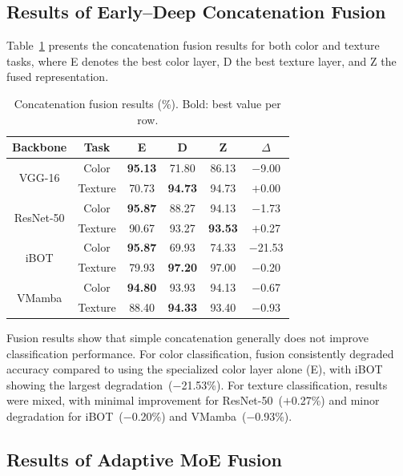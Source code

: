 \documentclass[conference]{IEEEtran}
\begin{document}
\subsection{Results of Early--Deep Concatenation Fusion}

Table~\ref{tab_concat} presents the concatenation fusion results for both
color and texture tasks, where E denotes the best color layer, D the best
texture layer, and Z the fused representation.

\begin{table}[htbp]
\caption{Concatenation fusion results (\%). Bold: best value per row.}
\begin{center}
\begin{tabular}{c|c|c|c|c|c}
\hline
\textbf{Backbone} & \textbf{Task} & \textbf{E} & \textbf{D}
                  & \textbf{Z} & \textbf{$\Delta$} \\
\hline
\multirow{2}{*}{VGG-16}
  & Color   & \textbf{95.13} & 71.80 & 86.13 & $-$9.00 \\
  & Texture & 70.73 & \textbf{94.73} & 94.73 & $+$0.00 \\
\hline
\multirow{2}{*}{ResNet-50}
  & Color   & \textbf{95.87} & 88.27 & 94.13 & $-$1.73 \\
  & Texture & 90.67 & 93.27 & \textbf{93.53} & $+$0.27 \\
\hline
\multirow{2}{*}{iBOT}
  & Color   & \textbf{95.87} & 69.93 & 74.33 & $-$21.53 \\
  & Texture & 79.93 & \textbf{97.20} & 97.00 & $-$0.20 \\
\hline
\multirow{2}{*}{VMamba}
  & Color   & \textbf{94.80} & 93.93 & 94.13 & $-$0.67 \\
  & Texture & 88.40 & \textbf{94.33} & 93.40 & $-$0.93 \\
\hline
\end{tabular}
\label{tab_concat}
\end{center}
\end{table}

Fusion results show that simple concatenation generally does not improve
classification performance.
For color classification, fusion consistently degraded accuracy compared
to using the specialized color layer alone (E), with iBOT showing the
largest degradation~($-$21.53\%).
For texture classification, results were mixed, with minimal improvement
for ResNet-50~($+$0.27\%) and minor degradation for iBOT~($-$0.20\%) and
VMamba~($-$0.93\%).

\subsection{Results of Adaptive MoE Fusion}
\end{document}
